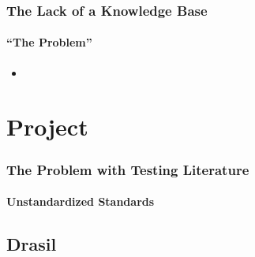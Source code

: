 \documentclass{beamer}
\begin{document}
\begin{frame}
    \frametitle{The Lack of a Knowledge Base}
    \framesubtitle{``The Problem''}
    \begin{itemize}
        \item \badTaxonomies{}
    \end{itemize}
\end{frame}


\section{Project}

\begin{frame}
    \frametitle{The Problem with Testing Literature}
    \framesubtitle{Unstandardized Standards}
\end{frame}

\subsection{Drasil}

\end{document}
